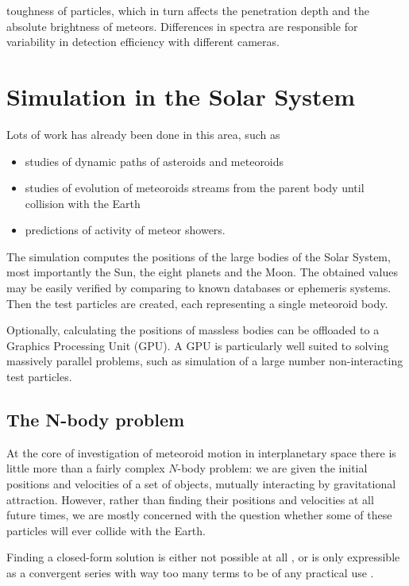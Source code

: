                 toughness of particles, which in turn affects the penetration depth
                and the absolute brightness of meteors.
                Differences in spectra are responsible for variability in detection efficiency with different cameras.


\section{Simulation in the Solar System} \label{ms}
    Lots of work has already been done in this area, such as
    \begin{itemize}
        \item studies of dynamic paths of asteroids and meteoroids
        \item studies of evolution of meteoroids streams from the parent body until collision with the Earth
        \item predictions of activity of meteor showers.
    \end{itemize}

    The simulation computes the positions of the large bodies of the Solar System, most importantly the Sun,
    the eight planets and the Moon. The obtained values may be easily verified by comparing to known databases
    or ephemeris systems.
    Then the test particles are created, each representing a single meteoroid body.

    Optionally, calculating the positions of massless bodies can be offloaded to a Graphics Processing Unit (GPU).
    A GPU is particularly well suited to solving massively parallel problems,
    such as simulation of a large number non-interacting test particles.

    \subsection{The N-body problem} \label{msN}
        At the core of investigation of meteoroid motion in interplanetary space
        there is little more than a fairly complex $N$-body problem:
        we are given the initial positions and velocities of a set of objects,
        mutually interacting by gravitational attraction.
        However, rather than finding their positions and velocities at all future times, we are mostly concerned
        with the question whether some of these particles will ever collide with the Earth.

        Finding a closed-form solution is either not possible at all \cite{...}, or is only expressible
        as a convergent series with way too many terms to be of any practical use \citep{beloriszky-1930}.

